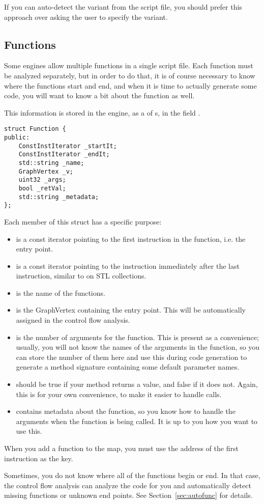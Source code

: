 If you can auto-detect the variant from the script file, you should prefer this approach over asking the user to specify the variant.

\subsection{Functions}
Some engines allow multiple functions in a single script file. Each function must be analyzed separately, but in order to do that, it is of course necessary to know where the functions start and end, and when it is time to actually generate some code, you will want to know a bit about the function as well.

This information is stored in the engine, as a  of s, in the field .

\begin{C++}
\begin{lstlisting}
struct Function {
public:
	ConstInstIterator _startIt;
	ConstInstIterator _endIt;
	std::string _name;
	GraphVertex _v;
	uint32 _args;
	bool _retVal;
	std::string _metadata;
};
\end{lstlisting}
\end{C++}

Each member of this struct has a specific purpose:
\begin{itemize}
\item {} is a const iterator pointing to the first instruction in the function, i.e. the entry point.
\item {} is a const iterator pointing to the instruction immediately after the last instruction, similar to  on STL collections.
\item {} is the name of the functions.
\item {} is the GraphVertex containing the entry point. This will be automatically assigned in the control flow analysis.
\item {} is the number of arguments for the function. This is present as a convenience; usually, you will not know the names of the arguments in the function, so you can store the number of them here and use this during code generation to generate a method signature containing some default parameter names.
\item {} should be true if your method returns a value, and false if it does not. Again, this is for your own convenience, to make it easier to handle calls.
\item {} contains metadata about the function, so you know how to handle the arguments when the function is being called. It is up to you how you want to use this.
\end{itemize}

When you add a function to the map, you must use the address of the first instruction as the key.

Sometimes, you do not know where all of the functions begin or end. In that case, the control flow analysis can analyze the code for you and automatically detect missing functions or unknown end points. See Section~\vref{sec:autofunc} for details.
